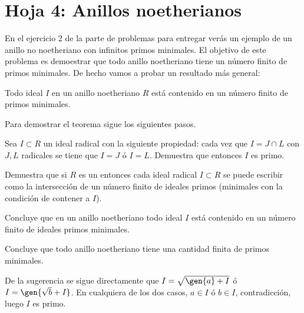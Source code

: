 \section{Hoja 4: Anillos noetherianos}

\begin{problem}[5] En el ejercicio 2 de la parte de problemas para entregar verás un ejemplo de un anillo no noetheriano con infinitos primos minimales. El objetivo de este problema es demoestrar que todo anillo noetheriano tiene un número finito de primos minimales. De hecho vamos a probar un resultado más general:

\begin{theorem} Todo ideal $I$ en un anillo noetheriano $R$ está contenido en un número finito de primos minimales.
\end{theorem}

Para demostrar el teorema sigue los siguientes pasos.

\ppart Sea $I ⊂ R$ un ideal radical con la siguiente propiedad: cada vez que $I = J ∩ L$ con $J, L$ radicales se tiene que $I = J$ ó $I = L$. Demuestra que entonces $I$ es primo. 

\ppart Demuestra que si $R$ es un  entonces cada ideal radical $I ⊂ R$ se puede escribir como la intersección de un número finito de ideales primos (minimales con la condición de contener a $I$). 

\ppart Concluye que en un anillo noetheriano todo ideal $I$ está contenido en un número finito de ideales primos minimales. 

\ppart Concluye que todo anillo noetheriano tiene una cantidad finita de primos minimales.

\solution


\spart

De la sugerencia se sigue directamente que $I = \sqrt{\gen{a} + I}$ ó $I = \gen{\sqrt{b} + I}$. En cualquiera de los dos casos, $a ∈ I$ ó $b ∈ I$, contradicción, luego $I$ es primo.


\end{problem}
